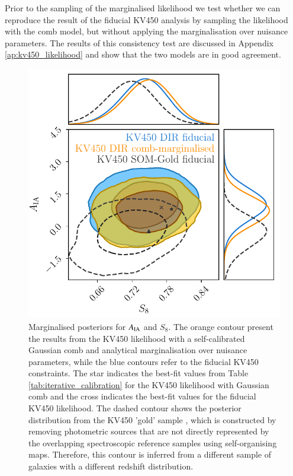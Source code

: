 \documentclass{aa}
\begin{document}
Prior to the sampling of the marginalised likelihood we test whether we can reproduce the result of the fiducial KV450 analysis by sampling the likelihood with the comb model, but without applying the marginalisation over nuisance parameters. The results of this consistency test are discussed in Appendix \ref{ap:kv450_likelihood} and show that the two models are in good agreement. 
\begin{figure}
\centering
\includegraphics[width=\linewidth]{plots/AIA_vs_S8}
\caption{Marginalised posteriors for $A_{\rm IA}$ and $S_8$. The orange contour present the results from the KV450 likelihood with a self-calibrated Gaussian comb and analytical marginalisation over nuisance parameters, while the blue contours refer to the fiducial KV450 constraints. The star indicates the best-fit values from Table \ref{tab:iterative_calibration} for the KV450 likelihood with Gaussian comb and the cross indicates the best-fit values for the fiducial KV450 likelihood. The dashed contour shows the posterior distribution from the KV450 'gold' sample \citep{wright_som_kv450}, which is constructed by removing photometric sources that are not directly represented by the overlapping spectroscopic reference samples using self-organising maps. Therefore, this contour is inferred from a different sample of galaxies with a different redshift distribution.}
\label{fig:AIA_vs_S8}
\end{figure}
\end{document}
